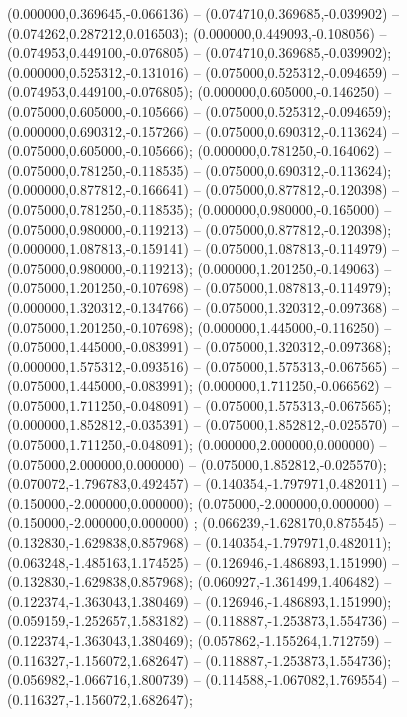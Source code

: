  (0.000000,0.369645,-0.066136) -- (0.074710,0.369685,-0.039902) -- (0.074262,0.287212,0.016503);
 (0.000000,0.449093,-0.108056) -- (0.074953,0.449100,-0.076805) -- (0.074710,0.369685,-0.039902);
 (0.000000,0.525312,-0.131016) -- (0.075000,0.525312,-0.094659) -- (0.074953,0.449100,-0.076805);
 (0.000000,0.605000,-0.146250) -- (0.075000,0.605000,-0.105666) -- (0.075000,0.525312,-0.094659);
 (0.000000,0.690312,-0.157266) -- (0.075000,0.690312,-0.113624) -- (0.075000,0.605000,-0.105666);
 (0.000000,0.781250,-0.164062) -- (0.075000,0.781250,-0.118535) -- (0.075000,0.690312,-0.113624);
 (0.000000,0.877812,-0.166641) -- (0.075000,0.877812,-0.120398) -- (0.075000,0.781250,-0.118535);
 (0.000000,0.980000,-0.165000) -- (0.075000,0.980000,-0.119213) -- (0.075000,0.877812,-0.120398);
 (0.000000,1.087813,-0.159141) -- (0.075000,1.087813,-0.114979) -- (0.075000,0.980000,-0.119213);
 (0.000000,1.201250,-0.149063) -- (0.075000,1.201250,-0.107698) -- (0.075000,1.087813,-0.114979);
 (0.000000,1.320312,-0.134766) -- (0.075000,1.320312,-0.097368) -- (0.075000,1.201250,-0.107698);
 (0.000000,1.445000,-0.116250) -- (0.075000,1.445000,-0.083991) -- (0.075000,1.320312,-0.097368);
 (0.000000,1.575312,-0.093516) -- (0.075000,1.575313,-0.067565) -- (0.075000,1.445000,-0.083991);
 (0.000000,1.711250,-0.066562) -- (0.075000,1.711250,-0.048091) -- (0.075000,1.575313,-0.067565);
 (0.000000,1.852812,-0.035391) -- (0.075000,1.852812,-0.025570) -- (0.075000,1.711250,-0.048091);
 (0.000000,2.000000,0.000000) -- (0.075000,2.000000,0.000000) -- (0.075000,1.852812,-0.025570);
 (0.070072,-1.796783,0.492457) -- (0.140354,-1.797971,0.482011) -- (0.150000,-2.000000,0.000000);
 (0.075000,-2.000000,0.000000) -- (0.150000,-2.000000,0.000000) ;
 (0.066239,-1.628170,0.875545) -- (0.132830,-1.629838,0.857968) -- (0.140354,-1.797971,0.482011);
 (0.063248,-1.485163,1.174525) -- (0.126946,-1.486893,1.151990) -- (0.132830,-1.629838,0.857968);
 (0.060927,-1.361499,1.406482) -- (0.122374,-1.363043,1.380469) -- (0.126946,-1.486893,1.151990);
 (0.059159,-1.252657,1.583182) -- (0.118887,-1.253873,1.554736) -- (0.122374,-1.363043,1.380469);
 (0.057862,-1.155264,1.712759) -- (0.116327,-1.156072,1.682647) -- (0.118887,-1.253873,1.554736);
 (0.056982,-1.066716,1.800739) -- (0.114588,-1.067082,1.769554) -- (0.116327,-1.156072,1.682647);
